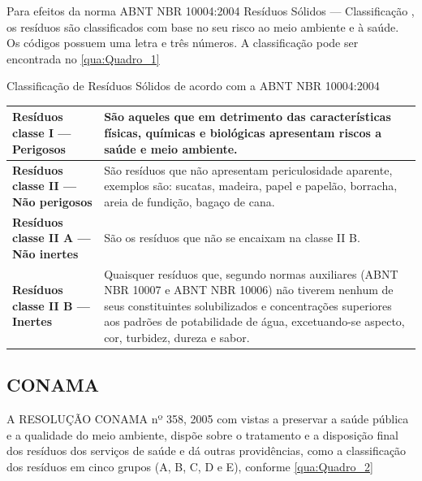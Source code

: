 Para efeitos da norma ABNT NBR 10004:2004 Resíduos Sólidos — Classificação \cite{abnt_abnt_2004}, os resíduos são classificados com base no seu risco ao meio ambiente e à saúde. Os códigos possuem uma letra e três números. A classificação pode ser encontrada no \autoref{qua:Quadro_1}

\begin{quadro}[htb]
	\centering
	\caption{\label{qua:Quadro_1} Classificação de Resíduos Sólidos de acordo com a ABNT NBR 10004:2004}	
	\resizebox{\textwidth}{!}
	{\begin{tabular}{|l|p{11cm}|}
		\hline
		\textbf{Resíduos classe I — Perigosos} & São aqueles que em detrimento das características físicas, químicas e biológicas apresentam riscos a saúde e meio ambiente.  \\ \hline
		\textbf{Resíduos classe II — Não perigosos}        & São resíduos que não apresentam periculosidade aparente, exemplos são: sucatas, madeira, papel e papelão, borracha, areia de fundição, bagaço de cana.\\ \hline
		\textbf{Resíduos classe II A — Não inertes}          & São os resíduos que não se encaixam na classe II B. \\ \hline
		\textbf{Resíduos classe II B — Inertes}        & Quaisquer resíduos que, segundo normas auxiliares (ABNT NBR 10007 e ABNT NBR 10006) não tiverem nenhum de seus constituintes solubilizados e concentrações superiores aos padrões de potabilidade de água, excetuando-se aspecto, cor, turbidez, dureza e sabor. \\ \hline
	\end{tabular}}
\end{quadro}


\subsection{CONAMA}

A RESOLUÇÃO CONAMA nº 358, 2005 \cite{noauthor_legislacao_conama_2005} com vistas a preservar a saúde pública e a qualidade do meio ambiente, dispõe sobre o tratamento e a disposição final dos resíduos dos serviços de saúde e dá outras providências, como a classificação dos resíduos em cinco grupos (A, B, C, D e E), conforme \autoref{qua:Quadro_2}

